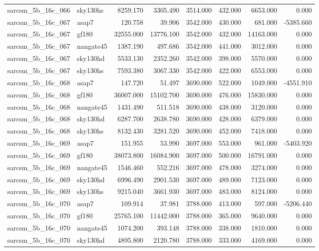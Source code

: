 \begin{tabular}{llrrrrrr}
sarcsm\_5b\_16c\_066 & sky130hs & 8259.170 & 3305.490 & 3514.000 & 432.000 & 6653.000 & 0.000 \\
sarcsm\_5b\_16c\_067 & asap7 & 120.758 & 39.906 & 3542.000 & 430.000 & 681.000 & -5385.660 \\
sarcsm\_5b\_16c\_067 & gf180 & 32555.000 & 13776.100 & 3542.000 & 432.000 & 14163.000 & 0.000 \\
sarcsm\_5b\_16c\_067 & nangate45 & 1387.190 & 497.686 & 3542.000 & 441.000 & 3012.000 & 0.000 \\
sarcsm\_5b\_16c\_067 & sky130hd & 5533.130 & 2352.260 & 3542.000 & 398.000 & 5570.000 & 0.000 \\
sarcsm\_5b\_16c\_067 & sky130hs & 7593.380 & 3067.330 & 3542.000 & 422.000 & 6553.000 & 0.000 \\
sarcsm\_5b\_16c\_068 & asap7 & 147.720 & 51.497 & 3690.000 & 522.000 & 1049.000 & -4551.910 \\
sarcsm\_5b\_16c\_068 & gf180 & 36007.000 & 15102.700 & 3690.000 & 476.000 & 15830.000 & 0.000 \\
sarcsm\_5b\_16c\_068 & nangate45 & 1431.490 & 511.518 & 3690.000 & 438.000 & 3120.000 & 0.000 \\
sarcsm\_5b\_16c\_068 & sky130hd & 6287.700 & 2638.780 & 3690.000 & 428.000 & 6379.000 & 0.000 \\
sarcsm\_5b\_16c\_068 & sky130hs & 8132.430 & 3281.520 & 3690.000 & 452.000 & 7418.000 & 0.000 \\
sarcsm\_5b\_16c\_069 & asap7 & 151.955 & 53.990 & 3697.000 & 553.000 & 961.000 & -5403.920 \\
sarcsm\_5b\_16c\_069 & gf180 & 38073.800 & 16084.900 & 3697.000 & 500.000 & 16791.000 & 0.000 \\
sarcsm\_5b\_16c\_069 & nangate45 & 1546.460 & 552.216 & 3697.000 & 478.000 & 3274.000 & 0.000 \\
sarcsm\_5b\_16c\_069 & sky130hd & 6996.490 & 2901.530 & 3697.000 & 489.000 & 7123.000 & 0.000 \\
sarcsm\_5b\_16c\_069 & sky130hs & 9215.040 & 3661.930 & 3697.000 & 483.000 & 8124.000 & 0.000 \\
sarcsm\_5b\_16c\_070 & asap7 & 109.914 & 37.981 & 3788.000 & 413.000 & 597.000 & -5206.440 \\
sarcsm\_5b\_16c\_070 & gf180 & 25765.100 & 11442.000 & 3788.000 & 365.000 & 9640.000 & 0.000 \\
sarcsm\_5b\_16c\_070 & nangate45 & 1074.200 & 393.148 & 3788.000 & 338.000 & 1810.000 & 0.000 \\
sarcsm\_5b\_16c\_070 & sky130hd & 4895.800 & 2120.780 & 3788.000 & 333.000 & 4169.000 & 0.000 \\

\end{tabular}
